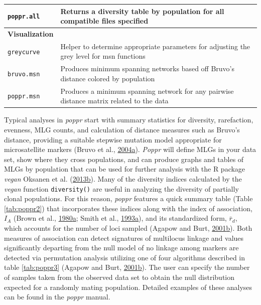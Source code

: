 \documentclass[double,12pt]{beavtex}
\begin{document}
\begin{table}
\begin{tabular}{ll}
  \texttt{poppr.all} & Returns a diversity table by population for all compatible files specified \\
  \hline
  \textbf{Visualization} & \\
  \texttt{greycurve} & Helper to determine appropriate parameters for adjusting the grey level for msn functions \\
  \texttt{bruvo.msn} & Produces minimum spanning networks based off Bruvo's distance colored by population \\
  \texttt{poppr.msn} & Produces a minimum spanning network for any pairwise distance matrix related to the data \\
  \hline
  
  \end{tabular}
  \end{table}
  
  Typical analyses in \emph{poppr} start with summary statistics for
  diversity, rarefaction, evenness, MLG counts, and calculation of
  distance measures such as Bruvo's distance, providing a suitable
  stepwise mutation model appropriate for microsatellite markers (Bruvo et
  al.,
  \protect\hyperlink{ref-Bruvo:2004}{2004}\protect\hyperlink{ref-Bruvo:2004}{a}).
  \emph{Poppr} will define MLGs in your data set, show where they cross
  populations, and can produce graphs and tables of MLGs by population
  that can be used for further analysis with the R package \emph{vegan}
  Oksanen et al.
  (\protect\hyperlink{ref-vegan}{2013}\protect\hyperlink{ref-vegan}{b}).
  Many of the diversity indices calculated by the \emph{vegan} function
  \texttt{diversity()} are useful in analyzing the diversity of partially
  clonal populations. For this reason, \emph{poppr} features a quick
  summary table (Table \ref{tab:poppr2}) that incorporates these indices
  along with the index of association, \(I_A\) (Brown et al.,
  \protect\hyperlink{ref-Brown:1980}{1980}\protect\hyperlink{ref-Brown:1980}{a};
  Smith et al.,
  \protect\hyperlink{ref-Smith:1993}{1993}\protect\hyperlink{ref-Smith:1993}{a}),
  and its standardized form, \(\bar{r}_d\), which accounts for the number
  of loci sampled (Agapow and Burt,
  \protect\hyperlink{ref-Agapow:2001}{2001}\protect\hyperlink{ref-Agapow:2001}{b}).
  Both measures of association can detect signatures of multilocus linkage
  and values significantly departing from the null model of no linkage
  among markers are detected via permutation analysis utilizing one of
  four algorithms described in table \ref{tab:poppr3} (Agapow and Burt,
  \protect\hyperlink{ref-Agapow:2001}{2001}\protect\hyperlink{ref-Agapow:2001}{b}).
  The user can specify the number of samples taken from the observed data
  set to obtain the null distribution expected for a randomly mating
  population. Detailed examples of these analyses can be found in the
  \emph{poppr} manual.
  
\end{document}

